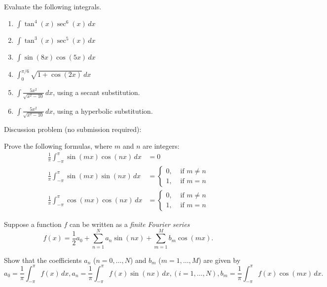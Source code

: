 \documentclass[12pt]{article}
\newcommand{\di}{\displaystyle}
\begin{document}
\newpage
Evaluate the following integrals.
  \begin{enumerate}
  \item $\di \int \tan^4(x)\sec^6(x)\,dx$
 
 \vspace{1.5in}
 
 \item  $\di \int \tan^3(x)\sec^5(x)\,dx$
 
 \vspace{1.75in}
 
 \item $\di \int \sin(8x)\cos(5x)\,dx$
 
 \vspace{1.75in}
 
 \item $\di \int_0^{\pi/6}\sqrt{1+\cos(2x)}\,dx$
 
 
 
 \pagebreak
 
 \item $\di \int \frac{5x^2}{\sqrt{x^2-10}}\,dx$, using a secant substitution.
 
 \vspace{1.75in}
 
\item  $\di \int \frac{5x^2}{\sqrt{x^2-10}}\,dx$, using a hyperbolic substitution.

\vspace{1.75in}

  \end{enumerate}

Discussion problem (no submission required):

Prove the following formulas, where $m$ and $n$ are integers:
\begin{align*}
\frac{1}{\pi}\int_{-\pi}^\pi\sin(mx)\cos(nx)\,dx & = 0\\
\frac{1}{\pi}\int_{-\pi}^\pi\sin(mx)\sin(nx)\,dx & = \begin{cases}0, & \text{ if } m\neq n\\1, & \text{ if } m=n\end{cases}\\
\frac{1}{\pi}\int_{-\pi}^\pi\cos(mx)\cos(nx)\,dx & = \begin{cases}0, & \text{ if } m\neq n\\1, & \text{ if } m=n\end{cases}
\end{align*}

\medskip

Suppose a function $f$ can be written as a \textit{finite Fourier series}
\[
f(x) = \frac{1}{2}a_0+\sum_{n=1}^N a_n\sin(nx)+\sum_{m=1}^M b_m\cos(mx).
\]

Show that the coefficients $a_n$ ($n=0,\ldots, N$) and $b_m$ ($m=1,\ldots, M$) are given by
\[
a_0 = \frac{1}{\pi}\int_{-\pi}^\pi f(x)\,dx, a_n = \frac{1}{\pi}\int_{-\pi}^\pi f(x)\sin(nx)\,dx, (i=1,\ldots, N), b_m = \frac{1}{\pi}\int_{-\pi}^\pi f(x)\cos(mx)\,dx.
\]
\end{document}
